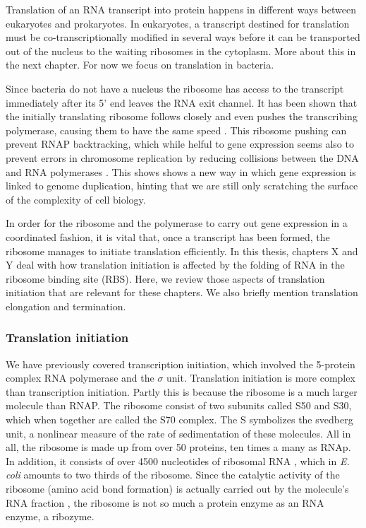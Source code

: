 %
Translation of an RNA transcript into protein happens in different ways between
eukaryotes and prokaryotes. In eukaryotes, a transcript destined for
translation must be co-transcriptionally modified in several ways before it can
be transported out of the nucleus to the waiting ribosomes in the cytoplasm.
More about this in the next chapter. For now we focus on translation in
bacteria.

Since bacteria do not have a nucleus the ribosome has access to the
transcript immediately after its 5' end leaves the RNA exit channel. It has
been shown that the initially translating ribosome follows closely and even
pushes the transcribing polymerase, causing them to have the same speed
\cite{proshkin_cooperation_2010}. This ribosome pushing can prevent RNAP
backtracking, which while helful to gene expression seems also to prevent
errors in chromosome replication by reducing collisions between the DNA and RNA
polymerases \cite{dutta_linking_2011}. This shows shows a new way in which
gene expression is linked to genome duplication, hinting that we are still only
scratching the surface of the complexity of cell biology.

In order for the ribosome and the polymerase to carry out gene expression in
a coordinated fashion, it is vital that, once a transcript has
been formed, the ribosome manages to initiate translation efficiently. In this
thesis, chapters X and Y deal with how translation initiation is affected by
the folding of RNA in the ribosome binding site (RBS). Here, we review those
aspects of translation initiation that are relevant for these chapters. We also
briefly mention translation elongation and termination.

\subsubsection{Translation initiation}

We have previously covered transcription initiation, which involved the
5-protein complex RNA polymerase and the $\sigma$ unit. Translation initiation
is more complex than transcription initiation. Partly this is because the
ribosome is a much larger molecule than RNAP. The ribosome consist of two
subunits called S50 and S30, which when together are called the S70 complex.
The S symbolizes the svedberg unit, a nonlinear measure of the rate of
sedimentation of these molecules. All in all, the ribosome is made up from over
50 proteins, ten times a many as RNAp. In addition, it consists of over 4500
nucleotides of ribosomal RNA \cite{laursen_initiation_2005}, which in
\textit{E. coli} amounts to two thirds of the ribosome. Since the catalytic
activity of the ribosome (amino acid bond formation) is actually carried out by
the molecule's RNA fraction \cite{steitz_rna_2003}, the ribosome is not so much
a protein enzyme as an RNA enzyme, a ribozyme.

